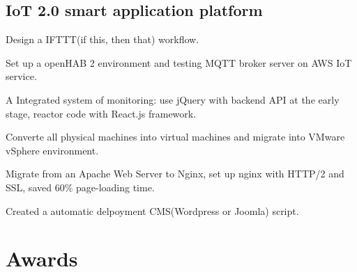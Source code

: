 \documentclass[]{deedy-resume-openfont}
\begin{document}
\begin{minipage}[t]{0.45\textwidth}
\subsection{IoT 2.0 smart application platform}
\begin{tightemize}
    \item Design a IFTTT(if this, then that) workflow.
    \item Set up a  openHAB 2 environment and testing MQTT broker server on AWS IoT service.
\end{tightemize}

\begin{tightemize}
    \item A Integrated system of monitoring: use jQuery with backend API at the early stage, reactor code with React.js framework.
\end{tightemize}
\sectionsep

\begin{tightemize}
    \item Converte all physical machines into virtual machines and migrate into VMware vSphere environment.
    \item Migrate from an Apache Web Server to Nginx, set up nginx with HTTP/2 and SSL, saved 60\% page-loading time.
    \item Created a automatic delpoyment CMS(Wordpress or Joomla) script.
\end{tightemize}
\sectionsep



\section{Awards}


\sectionsep

%
%

\end{minipage}
\end{document}

